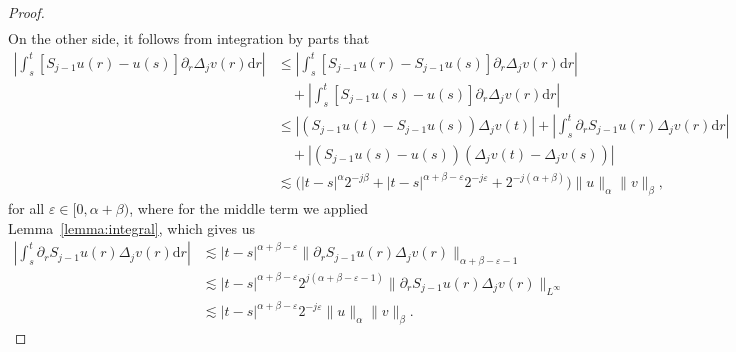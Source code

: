 \documentclass[11pt,a4paper]{article}
\newcommand{\mathd}{\mathrm{d}}
\theoremstyle{remark}
\begin{document}
\begin{proof}
\begin{align}
  \end{align}
  On the other side, it follows from integration by parts that
  \begin{align}\label{eq:controlled old and new pr2}
     \left| \int_{s}^{t} [ S_{j-1} u ( r ) - u ( s ) ] \partial_{r}  \Delta_{j} v ( r ) \mathd r \right| & \leqslant \left| \int_{s}^{t} [ S_{j-1} u ( r ) -S_{j-1} u ( s ) ] \partial_{r}  \Delta_{j} v ( r ) \mathd r \right| \\ \nonumber
     &\quad + \left| \int_{s}^{t} [ S_{j-1} u ( s ) - u ( s ) ] \partial_{r}  \Delta_{j} v ( r ) \mathd r \right|\\ \nonumber
     & \leqslant | (S_{j-1} u ( t ) - S_{j-1} u(s))  \Delta_{j} v ( t ) | + \left| \int_{s}^{t} \partial_{r} S_{j-1} u ( r )    \Delta_{j} v ( r ) \mathd r \right|\\ \nonumber
     &\quad + |(S_{j-1} u ( s ) - u ( s ))(\Delta_j v(t) - \Delta_j v(s))| \\ \nonumber
     &\lesssim \big( |t-s|^\alpha 2^{-j\beta} + |t-s|^{\alpha+\beta-\varepsilon} 2^{-j\varepsilon} + 2^{-j(\alpha+\beta)}\big)  \|u\|_\alpha \|v\|_\beta,
  \end{align}
  for all $\varepsilon \in [0,\alpha+\beta)$, where for the middle term we applied Lemma~\ref{lemma:integral}, which gives us
  \begin{align*}
      \left| \int_{s}^{t} \partial_{r} S_{j-1} u ( r ) \Delta_{j} v ( r ) \mathd r \right| & \lesssim |t-s|^{\alpha+\beta-\varepsilon} \|\partial_{r} S_{j-1} u ( r ) \Delta_{j} v ( r )\|_{\alpha+\beta-\varepsilon-1}\\
      & \lesssim |t-s|^{\alpha+\beta-\varepsilon} 2^{j(\alpha+\beta-\varepsilon-1)} \|\partial_{r} S_{j-1} u ( r ) \Delta_{j} v ( r )\|_{L^\infty} \\
      & \lesssim |t-s|^{\alpha+\beta-\varepsilon} 2^{-j\varepsilon} \|u\|_\alpha \|v\|_\beta.
  \end{align*}
%  
%  

\end{proof}
\end{document}
